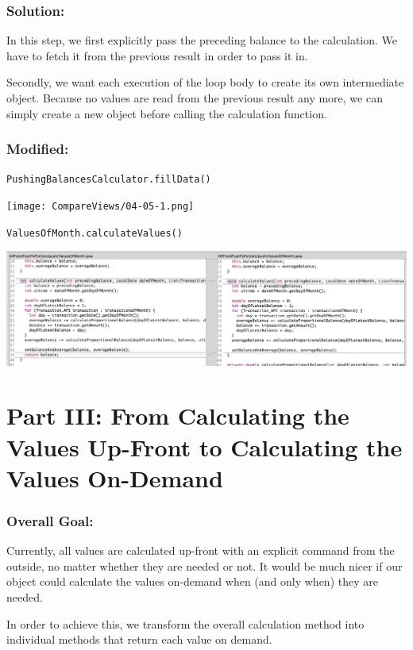 \documentclass[a4paper,fleqn,titlepage,11pt]{article}
\begin{document}
\subsubsection*{Solution:}


In this step, we first explicitly pass the preceding balance to the calculation. We have to fetch it from the previous result in order to pass it in.

Secondly, we want each execution of the loop body to create its own intermediate object. Because no values are read from the previous result any more, we can simply create a new object before calling the calculation function.

\subsubsection*{Modified:}

\texttt{PushingBalancesCalculator.fillData()}

\texttt{[image: CompareViews/04-05-1.png]}

\texttt{ValuesOfMonth.calculateValues()}

\includegraphics[width=1\textwidth]{CompareViews/04-05-2.png}


\section*{Part III: From Calculating the Values Up-Front to Calculating the Values On-Demand}

\subsubsection*{Overall Goal:}

Currently, all values are calculated up-front with an explicit command from the outside, no matter whether they are needed or not. It would be much nicer if our object could calculate the values on-demand when (and only when) they are needed.

In order to achieve this, we transform the overall calculation method into individual methods that return each value on demand.
\end{document}
